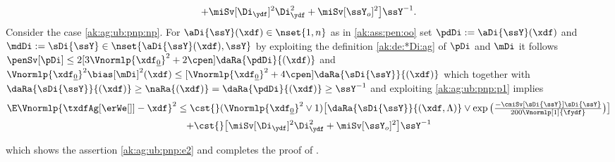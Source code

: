 \begin{pro}
\begin{multline}
  +\miSv[\Di_{\ydf}]^2\Di_{\ydf}^2+\miSv[\ssY_{o}]^2 \big]\ssY^{-1}.
\end{multline}
Consider the case \ref{ak:ag:ub:pnp:np}. For $\aDi{\ssY}(\xdf)\in\nset{1,n}$
as in \ref{ak:ass:pen:oo}  set $\pdDi:=\aDi{\ssY}(\xdf)$ and $\mdDi:=\sDi{\ssY}\in\nset{\aDi{\ssY}(\xdf),\ssY}$ by exploiting the definition
\eqref{ak:de:*Di:ag} of $\pDi$ and $\mDi$ it follows
$\penSv[\pDi] \leq 2[3\Vnormlp{\xdf_{\underline{0}}}^2+ 2\cpen]
\daRa{\pdDi}{(\xdf)}$ and 
$\Vnormlp{\xdf_{\underline{0}}}^2\bias[\mDi]^2(\xdf)\leq
      [\Vnormlp{\xdf_{\underline{0}}}^2+4\cpen]\daRa{\sDi{\ssY}}{(\xdf)}$
which together with
$\daRa{\sDi{\ssY}}{(\xdf)}\geq\naRa{(\xdf)}=\daRa{\pdDi}{(\xdf)}\geq\ssY^{-1}$
and exploiting 
\eqref{ak:ag:ub:pnp:p1} implies%
 \begin{multline}\label{ak:ag:ub:pnp:p8}
   \E\Vnormlp{\txdfAg[{\erWe[]}]-\xdf}^2%
    \leq 
   \cst{}(\Vnormlp{\xdf_{\underline{0}}}^2\vee1)\big[\daRa{\sDi{\ssY}}{(\xdf,\Lambda)}\vee\exp\big(\tfrac{-\cmiSv[\sDi{\ssY}]\sDi{\ssY}}{200\Vnormlp[1]{\fydf}}\big)\big]\\
   +\cst{}\big[\miSv[\Di_{\ydf}]^2\Di_{\ydf}^2+\miSv[\ssY_{o}]^2 \big]\ssY^{-1}
\end{multline}

which shows the assertion \eqref{ak:ag:ub:pnp:e2} and  completes the
proof of .\proEnd\end{pro}
